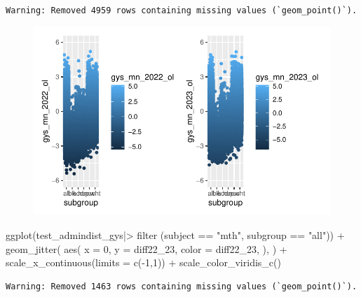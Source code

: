 \documentclass[
  letterpaper,
  DIV=11,
  numbers=noendperiod]{scrartcl}
\newenvironment{Shaded}{\begin{snugshade}}{\end{snugshade}}
\newcommand{\AttributeTok}[1]{\textcolor[rgb]{0.40,0.45,0.13}{#1}}
\newcommand{\DecValTok}[1]{\textcolor[rgb]{0.68,0.00,0.00}{#1}}
\newcommand{\FunctionTok}[1]{\textcolor[rgb]{0.28,0.35,0.67}{#1}}
\newcommand{\NormalTok}[1]{\textcolor[rgb]{0.00,0.23,0.31}{#1}}
\newcommand{\SpecialCharTok}[1]{\textcolor[rgb]{0.37,0.37,0.37}{#1}}
\newcommand{\StringTok}[1]{\textcolor[rgb]{0.13,0.47,0.30}{#1}}
\begin{document}
\begin{verbatim}
Warning: Removed 4959 rows containing missing values (`geom_point()`).
\end{verbatim}

\begin{figure}[H]

{\centering \includegraphics{GeospatialMapping_files/figure-pdf/district-scores-scatter-3.pdf}

}

\end{figure}

\begin{Shaded}
\begin{Highlighting}[]
\FunctionTok{ggplot}\NormalTok{(test\_admindist\_gys}\SpecialCharTok{|\textgreater{}} \FunctionTok{filter}\NormalTok{ (subject }\SpecialCharTok{==} \StringTok{"mth"}\NormalTok{, subgroup }\SpecialCharTok{==} \StringTok{"all"}\NormalTok{)) }\SpecialCharTok{+}
  \FunctionTok{geom\_jitter}\NormalTok{(}
    \FunctionTok{aes}\NormalTok{(}
      \AttributeTok{x =} \DecValTok{0}\NormalTok{,}
      \AttributeTok{y =}\NormalTok{ diff22\_23,}
      \AttributeTok{color =}\NormalTok{ diff22\_23,}
\NormalTok{      ),}
\NormalTok{    ) }\SpecialCharTok{+}
  \FunctionTok{scale\_x\_continuous}\NormalTok{(}\AttributeTok{limits =} \FunctionTok{c}\NormalTok{(}\SpecialCharTok{{-}}\DecValTok{1}\NormalTok{,}\DecValTok{1}\NormalTok{)) }\SpecialCharTok{+}
  \FunctionTok{scale\_color\_viridis\_c}\NormalTok{()}
\end{Highlighting}
\end{Shaded}

\begin{verbatim}
Warning: Removed 1463 rows containing missing values (`geom_point()`).
\end{verbatim}
\end{document}
